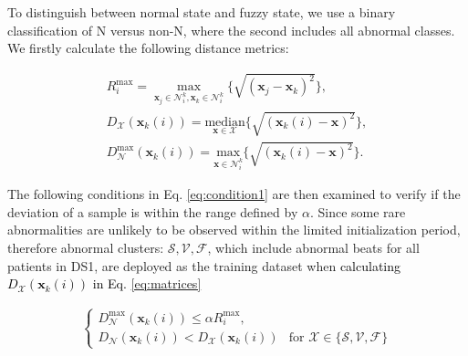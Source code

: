 To distinguish between normal state and fuzzy state, we use a binary classification of N versus non-N, where the second includes all abnormal classes. We firstly calculate the following distance metrics:

\begin{align}
R_i^{\max}=\underset{\mathbf{x}_j\in\mathcal{N}_i^k,\mathbf{x}_k\in\mathcal{N}_i^k}{\max}\{\sqrt{(\mathbf{x}_j-\mathbf{x}_k)^2}\},\\
\label{eq:matrices}
D_\mathcal{X}(\mathbf{x}_k(i))=\underset{\mathbf{x} \in\mathcal{X}}{\text{median}}\{\sqrt{(\mathbf{x}_k(i)-\mathbf{x})^2}\},
\\
D_\mathcal{N}^{\max}(\mathbf{x}_k(i))=\underset{\mathbf{x} \in\mathcal{N}_i^k}{\text{max}}\{\sqrt{(\mathbf{x}_k(i)-\mathbf{x})^2}\}.
\end{align}

The following conditions in Eq. \ref{eq:condition1} are then examined to verify if the deviation of a sample is within the range defined by $\alpha$. Since some rare abnormalities are unlikely to be observed within the limited initialization period, therefore abnormal clusters: ${\mathcal{S},\mathcal{V},\mathcal{F}}$, which include abnormal beats for all patients in DS1, are deployed as the training dataset when \textcolor{black}{calculating $D_\mathcal{X}(\mathbf{x}_k(i))$ in Eq. \ref{eq:matrices}} %

\begin{align}\label{eq:condition1}
\begin{cases}
D_\mathcal{N}^{\max}(\mathbf{x}_k(i))  \leq\alpha R_i^{\max},\\
D_\mathcal{N}(\mathbf{x}_k(i)) < D_\mathcal{X}(\mathbf{x}_k(i)) &\text{for~} \mathcal{X}\in\{\mathcal{S},\mathcal{V},\mathcal{F}\}   %
\end{cases}
\end{align}

